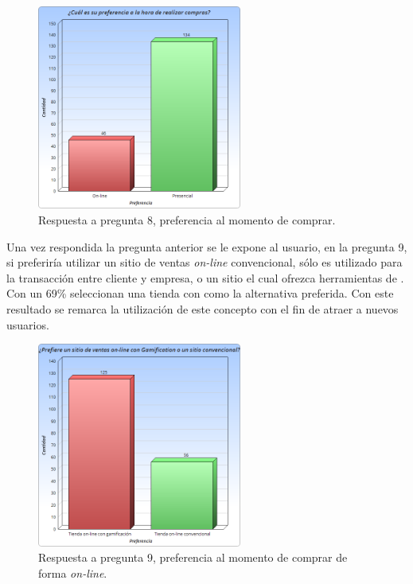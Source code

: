 \begin{figure}[!htb]
  \centering
  \includegraphics[width=0.6\textwidth]{images/Graficos/graf_5_9.png}
  \caption[chart5.9]{Respuesta a pregunta 8, preferencia al momento de comprar.}
  \label{fig:chart5.9}
\end{figure}

Una vez respondida la pregunta anterior se le expone al usuario, en la pregunta 9,
si preferiría utilizar un sitio de ventas \emph{on-line} convencional, sólo es utilizado
para la transacción entre cliente y empresa, o un sitio el cual ofrezca
herramientas de {\GAM}.
Con un 69\% seleccionan una tienda con {\GAM} como la alternativa preferida.
Con este resultado se remarca la utilización de este concepto con el fin de atraer
a nuevos usuarios.

\begin{figure}[!htb]
  \centering
  \includegraphics[width=0.6\textwidth]{images/Graficos/graf_5_10.png}
  \caption[chart5.10]{Respuesta a pregunta 9, preferencia al momento de comprar de forma \emph{on-line}.}
  \label{fig:chart5.10}
\end{figure}


